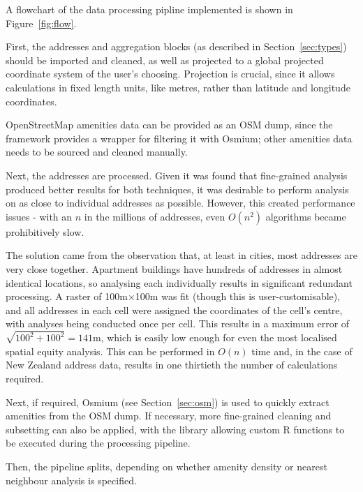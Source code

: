 \documentclass[12pt,a4paper]{article}
\begin{document}
A flowchart of the data processing pipline implemented is shown in Figure~\ref{fig:flow}.

First, the addresses and aggregation blocks (as described in Section~\ref{sec:types}) should be imported and cleaned, as well as projected to a global projected coordinate system of the user's choosing. Projection is crucial, since it allows calculations in fixed length units, like metres, rather than latitude and longitude coordinates. 

OpenStreetMap amenities data can be provided as an OSM dump, since the framework provides a wrapper for filtering it with Osmium; other amenities data needs to be sourced and cleaned manually.

Next, the addresses are processed. Given it was found that fine-grained analysis produced better results for both techniques, it was desirable to perform analysis on as close to individual addresses as possible.
However, this created performance issues - with an $n$ in the millions of addresses, even $O(n^2)$ algorithms became prohibitively slow.

The solution came from the observation that, at least in cities, most addresses are very close together. Apartment buildings have hundreds of addresses in almost identical locations, so analysing each individually results in significant redundant processing. A raster of 100m$\times$100m was fit (though this is user-customisable), and all addresses in each cell were assigned the coordinates of the cell's centre, with analyses being conducted once per cell. This results in a maximum error of $\sqrt{100^2+100^2}=141\textrm{m}$, which is easily low enough for even the most localised spatial equity analysis. This can be performed in $O(n)$ time and, in the case of New Zealand address data, results in one thirtieth the number of calculations required.

Next, if required, Osmium (see Section~\ref{sec:osm}) is used to quickly extract amenities from the OSM dump. If necessary, more fine-grained cleaning and subsetting can also be applied, with the library allowing custom R functions to be executed during the processing pipeline.

Then, the pipeline splits, depending on whether amenity density or nearest neighbour analysis is specified. 
\end{document}
